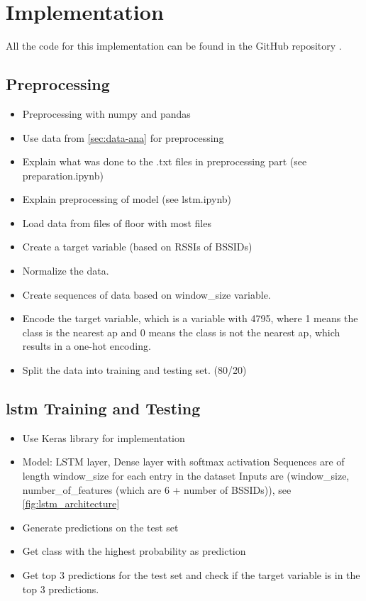 \chapter{Implementation}\label{sec:implementation}

All the code for this implementation can be found in the GitHub repository \cite{github-repo}.

\section{Preprocessing}
\begin{itemize}
    \item Preprocessing with numpy and pandas
    \item Use data from \cref{sec:data-ana} for preprocessing
    \item Explain what was done to the .txt files in preprocessing part  (see \cite{github-repo} preparation.ipynb)
    \item Explain preprocessing of model (see \cite{github-repo} lstm.ipynb)
    \item Load data from files of floor with most files
    \item Create a target variable (based on RSSIs of BSSIDs)
    \item Normalize the data.
    \item Create sequences of data based on window\_size variable.
    \item Encode the target variable, which is a variable with 4795, where 1 means the class is the nearest \ac{ap} and 0 means the class is not the nearest \ac{ap}, which results in a one-hot encoding.
    \item Split the data into training and testing set. (80/20)
\end{itemize}

%     

\section{\ac{lstm} Training and Testing}
\begin{itemize}
    \item Use Keras library for implementation \cite{keras}
    \item Model: LSTM layer, Dense layer with softmax activation
    \subitem Sequences are of length window\_size for each entry in the dataset
    \subitem Inputs are (window\_size, number\_of\_features (which are 6 + number of BSSIDs)), see \cref{fig:lstm_architecture}
    \item Generate predictions on the test set
    \item Get class with the highest probability as prediction
    \item Get top 3 predictions for the test set and check if the target variable is in the top 3 predictions.
\end{itemize}

